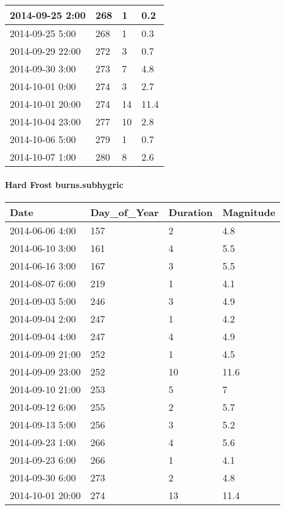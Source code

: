 \documentclass[
]{article}
\begin{document}
\begin{tabular}{l|l|l|l}
\hline
2014-09-25 2:00 & 268 & 1 & 0.2\\
\hline
2014-09-25 5:00 & 268 & 1 & 0.3\\
\hline
2014-09-29 22:00 & 272 & 3 & 0.7\\
\hline
2014-09-30 3:00 & 273 & 7 & 4.8\\
\hline
2014-10-01 0:00 & 274 & 3 & 2.7\\
\hline
2014-10-01 20:00 & 274 & 14 & 11.4\\
\hline
2014-10-04 23:00 & 277 & 10 & 2.8\\
\hline
2014-10-06 5:00 & 279 & 1 & 0.7\\
\hline
2014-10-07 1:00 & 280 & 8 & 2.6\\
\hline
\end{tabular}

\hypertarget{hard-frost-burns.subhygric}{%
\paragraph{Hard Frost
burns.subhygric}\label{hard-frost-burns.subhygric}}

\begin{tabular}{l|l|l|l}
\hline
Date & Day\_of\_Year & Duration & Magnitude\\
\hline
2014-06-06 4:00 & 157 & 2 & 4.8\\
\hline
2014-06-10 3:00 & 161 & 4 & 5.5\\
\hline
2014-06-16 3:00 & 167 & 3 & 5.5\\
\hline
2014-08-07 6:00 & 219 & 1 & 4.1\\
\hline
2014-09-03 5:00 & 246 & 3 & 4.9\\
\hline
2014-09-04 2:00 & 247 & 1 & 4.2\\
\hline
2014-09-04 4:00 & 247 & 4 & 4.9\\
\hline
2014-09-09 21:00 & 252 & 1 & 4.5\\
\hline
2014-09-09 23:00 & 252 & 10 & 11.6\\
\hline
2014-09-10 21:00 & 253 & 5 & 7\\
\hline
2014-09-12 6:00 & 255 & 2 & 5.7\\
\hline
2014-09-13 5:00 & 256 & 3 & 5.2\\
\hline
2014-09-23 1:00 & 266 & 4 & 5.6\\
\hline
2014-09-23 6:00 & 266 & 1 & 4.1\\
\hline
2014-09-30 6:00 & 273 & 2 & 4.8\\
\hline
2014-10-01 20:00 & 274 & 13 & 11.4\\
\hline
\end{tabular}
\end{document}
